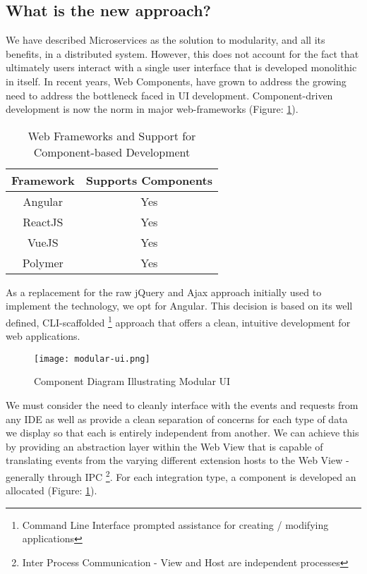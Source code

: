 \subsection{What is the new approach?}

We have described Microservices as the solution to modularity, and all its benefits, in a distributed system. However, this does not account for the fact that ultimately users interact with a single user interface that is developed monolithic in itself. In recent years, Web Components, have grown to address the growing need to address the bottleneck faced in UI development. Component-driven development is now the norm in major web-frameworks (Figure: \ref{table:webFrameworkComponentSupport}).

\begin{table}[h!]
	\centering
	\begin{tabular}{|c|c|}
		\hline 
		Framework & Supports Components \\ 
		\hline 
		\hline 
		Angular & Yes \\ 
		\hline
		ReactJS & Yes \\ 
		\hline 
		VueJS & Yes \\ 
		\hline
		Polymer & Yes \\ 
		\hline  
	\end{tabular} 
	\caption{Web Frameworks and Support for Component-based Development}
	\label{table:webFrameworkComponentSupport}
\end{table}

As a replacement for the raw jQuery and Ajax approach initially used to implement the technology, we opt for Angular. This decision is based on its well defined, CLI-scaffolded \footnote{Command Line Interface prompted assistance for creating / modifying applications} approach that offers a clean, intuitive development for web applications.

\begin{figure}[h!]
	\centering
	\texttt{[image: modular-ui.png]}
	\caption{Component Diagram Illustrating Modular UI}
	\label{fig:modularUIComponentDiagram}
\end{figure}


We must consider the need to cleanly interface with the events and requests from  any IDE as well as provide a clean separation of concerns for each type of data we display so that each is entirely independent from another. We can achieve this by providing an abstraction layer within the Web View that is capable of translating events from the varying different extension hosts to the Web View - generally through IPC \footnote{Inter Process Communication - View and Host are independent processes}. For each integration type, a component is developed an allocated (Figure: \ref{fig:modularUIComponentDiagram}). 

